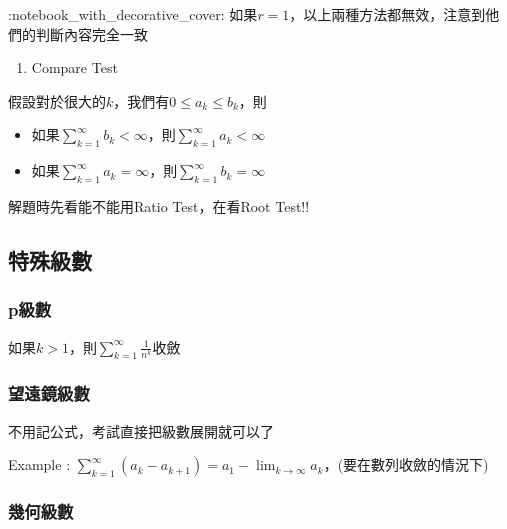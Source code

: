 \documentclass[
]{book}
\providecommand{\tightlist}{%
  \setlength{\itemsep}{0pt}\setlength{\parskip}{0pt}}
\begin{document}
:notebook\_with\_decorative\_cover: 如果\(r=1\)，以上兩種方法都無效，注意到他們的判斷內容完全一致

\begin{enumerate}
\def\labelenumi{\arabic{enumi}.}
\setcounter{enumi}{2}
\tightlist
\item
  Compare Test
\end{enumerate}

假設對於很大的\(k\)，我們有\(0 \leq a_k \leq b_k\)，則

\begin{itemize}
\tightlist
\item
  如果\(\sum_{k=1}^{\infty}b_k < \infty\)，則\(\sum_{k=1}^{\infty}a_k < \infty\)
\item
  如果\(\sum_{k=1}^{\infty}a_k = \infty\)，則\(\sum_{k=1}^{\infty}b_k = \infty\)
\end{itemize}

解題時先看能不能用Ratio Test，在看Root Test!!

\hypertarget{ux7279ux6b8aux7d1aux6578}{%
\subsection{特殊級數}\label{ux7279ux6b8aux7d1aux6578}}

\hypertarget{pux7d1aux6578}{%
\subsubsection*{p級數}\label{pux7d1aux6578}}

如果\(k>1\)，則\(\sum_{k=1}^{\infty}\frac{1}{n^k}\)收斂

\hypertarget{ux671bux9060ux93e1ux7d1aux6578}{%
\subsubsection*{望遠鏡級數}\label{ux671bux9060ux93e1ux7d1aux6578}}

不用記公式，考試直接把級數展開就可以了

Example : \(\sum_{k=1}^{\infty}(a_k - a_{k+1}) = a_1 - \lim_{k \to \infty}a_k\)，(要在數列收斂的情況下)

\hypertarget{ux5e7eux4f55ux7d1aux6578}{%
\subsubsection*{幾何級數}\label{ux5e7eux4f55ux7d1aux6578}}
\end{document}
